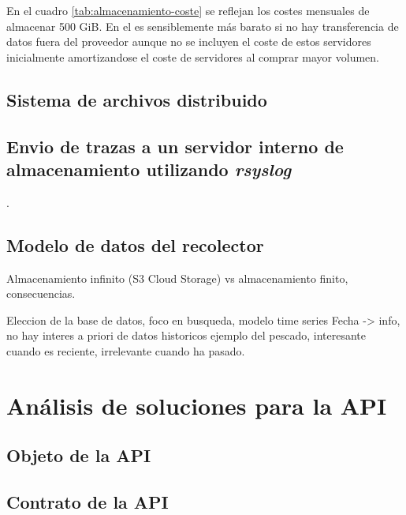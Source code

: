 En el cuadro \ref{tab:almacenamiento-coste} se reflejan los costes mensuales de almacenar 500 GiB. En el es sensiblemente más barato si no hay transferencia de datos fuera del proveedor aunque no se incluyen
el coste de estos servidores inicialmente amortizandose el coste de servidores al comprar mayor volumen.

\subsection{Sistema de archivos distribuido}



\subsection{Envio de trazas a un servidor interno de almacenamiento utilizando \emph{rsyslog}}.


\subsection{Modelo de datos del recolector}

Almacenamiento infinito (S3 Cloud Storage) vs almacenamiento finito, consecuencias. 

Eleccion de la base de datos, foco en busqueda, modelo time series Fecha -> info, no hay interes a priori de datos historicos
ejemplo del pescado, interesante cuando es reciente, irrelevante cuando ha pasado.

\section{Análisis de soluciones para la API}


\subsection{Objeto de la API}


\subsection{Contrato de la API}

